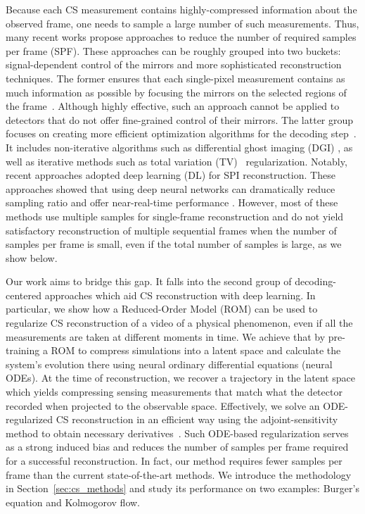 Because each CS measurement contains highly-compressed information about the observed frame, one needs to sample a large number of such measurements. Thus, many recent works propose approaches to reduce the number of required samples per frame (SPF). These approaches can be roughly grouped into two buckets: signal-dependent control of the mirrors and more sophisticated reconstruction techniques. The former ensures that each single-pixel measurement contains as much information as possible by focusing the mirrors on the selected regions of the frame~\cite{zhang2017fast,sun2017russian,xu20181000}. Although highly effective, such an approach cannot be applied to detectors that do not offer fine-grained control of their mirrors. The latter group focuses on creating more efficient optimization algorithms for the decoding step~\cite{katz2009compressive}. It includes non-iterative algorithms such as differential ghost imaging (DGI) \cite{gong2010method}, as well as iterative methods such as total variation (TV)~\cite{suo2016signal} regularization. Notably, recent approaches adopted deep learning (DL) for SPI reconstruction. These approaches showed that using deep neural networks can dramatically reduce sampling ratio and offer near-real-time performance \cite{lyu2017deep,higham2018deep,wang2019learning,wang2022single}. However, most of these methods use multiple samples for single-frame reconstruction and do not yield satisfactory reconstruction of multiple sequential frames when the number of samples per frame is small, even if the total number of samples is large, as we show below.

Our work aims to bridge this gap. It falls into the second group of decoding-centered approaches which aid CS reconstruction with deep learning. In particular, we show how a Reduced-Order Model (ROM) can be used to regularize CS reconstruction of a video of a physical phenomenon, even if all the measurements are taken at different moments in time. We achieve that by pre-training a ROM to compress simulations into a latent space and calculate the system's evolution there using neural ordinary differential equations (neural ODEs). At the time of reconstruction, we recover a trajectory in the latent space which yields compressing sensing measurements that match what the detector recorded when projected to the observable space. Effectively, we solve an ODE-regularized CS reconstruction in an efficient way using the adjoint-sensitivity method to obtain necessary derivatives~\cite{chen2018neuralode}. Such ODE-based regularization serves as a strong induced bias and reduces the number of samples per frame required for a successful reconstruction. In fact, our method requires fewer samples per frame than the current state-of-the-art methods. We introduce the methodology in Section~\ref{sec:cs_methods} and study its performance on two examples: Burger's equation and Kolmogorov flow.

